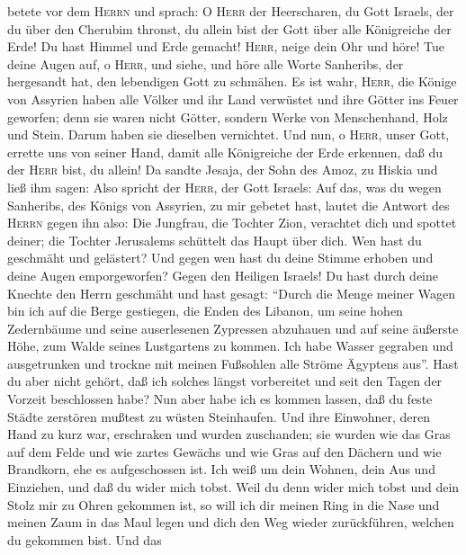 betete vor dem \textsc{Herrn} und sprach:  O
\textsc{Herr} der Heerscharen, du Gott Israels, der du über den Cherubim
thronst, du allein bist der Gott über alle Königreiche der Erde! Du hast
Himmel und Erde gemacht!  \textsc{Herr}, neige dein Ohr
und höre! Tue deine Augen auf, o \textsc{Herr}, und siehe, und höre alle
Worte Sanheribs, der hergesandt hat, den lebendigen Gott zu schmähen.
 Es ist wahr, \textsc{Herr}, die Könige von Assyrien
haben alle Völker und ihr Land verwüstet  und ihre Götter
ins Feuer geworfen; denn sie waren nicht Götter, sondern Werke von
Menschenhand, Holz und Stein. Darum haben sie dieselben vernichtet.
 Und nun, o \textsc{Herr}, unser Gott, errette uns von
seiner Hand, damit alle Königreiche der Erde erkennen, daß du der
\textsc{Herr} bist, du allein!  Da sandte Jesaja, der
Sohn des Amoz, zu Hiskia und ließ ihm sagen: Also spricht der
\textsc{Herr}, der Gott Israels: Auf das, was du wegen Sanheribs, des
Königs von Assyrien, zu mir gebetet hast, lautet die Antwort des
\textsc{Herrn} gegen ihn also:  Die Jungfrau, die Tochter
Zion, verachtet dich und spottet deiner; die Tochter Jerusalems
schüttelt das Haupt über dich.  Wen hast du geschmäht und
gelästert? Und gegen wen hast du deine Stimme erhoben und deine Augen
emporgeworfen? Gegen den Heiligen Israels!  Du hast durch
deine Knechte den Herrn geschmäht und hast gesagt: ``Durch die Menge
meiner Wagen bin ich auf die Berge gestiegen, die Enden des Libanon, um
seine hohen Zedernbäume und seine auserlesenen Zypressen abzuhauen und
auf seine äußerste Höhe, zum Walde seines Lustgartens zu kommen.
 Ich habe Wasser gegraben und ausgetrunken und trockne
mit meinen Fußsohlen alle Ströme Ägyptens aus''.  Hast du
aber nicht gehört, daß ich solches längst vorbereitet und seit den Tagen
der Vorzeit beschlossen habe? Nun aber habe ich es kommen lassen, daß du
feste Städte zerstören mußtest zu wüsten Steinhaufen. 
Und ihre Einwohner, deren Hand zu kurz war, erschraken und wurden
zuschanden; sie wurden wie das Gras auf dem Felde und wie zartes Gewächs
und wie Gras auf den Dächern und wie Brandkorn, ehe es aufgeschossen
ist.  Ich weiß um dein Wohnen, dein Aus und Einziehen,
und daß du wider mich tobst.  Weil du denn wider mich
tobst und dein Stolz mir zu Ohren gekommen ist, so will ich dir meinen
Ring in die Nase und meinen Zaum in das Maul legen und dich den Weg
wieder zurückführen, welchen du gekommen bist.  Und das
